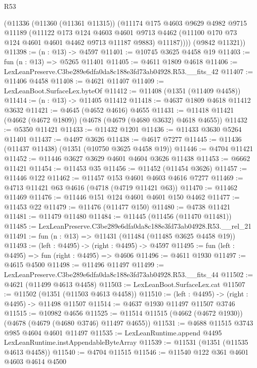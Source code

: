 \begin{lexlean}{R53}
\begin{coremodule}
        (@11336
          (@11360 (@11361 @11315))
          (@11174
            @175
            @4603
            @9629
            @4982
            @9715
            @11189
            (@11122
              @173
              @124
              @4603
              @4601
              @9713
              @4462
              (@11100 @170 @73 @124 @4601 @4601 @4462 @9713 @11187 @9883)
              @11187))))
      (@9842 @11321))
@11398 := (n : @13) -> @4597
@11401 := @10745 @3625 @4458 @19
@11403 := fun (n : @13) => @5265 @11401
@11405 := @4611 @1809 @4618
@11406 := LexLeanPreserve.C3be289e6dfa0da8c188e3fd73ab04928.R53.__fits_42
@11407 := @11406 @4458
@11408 := @4621 @11407
@11409 := LexLeanBoot.SurfaceLex.byteOf
@11412 := @11408 (@1351 (@11409 @4458))
@11414 := (n : @13) -> @11405 @11412
@11418 := @4637 @1809 @4618 @11412 @3632
@11421 := @4645 (@4652 @4616) @4655
@11431 := @11418 @11421 (@4662 (@4672 @1809)) (@4678 (@4679 (@4680 @3632) @4618 @4655))
@11432 := @5350 @11421
@11433 := @11432 @1201
@11436 := @11433 @3630 @5264 @11401
@11437 := @4497 @3626
@11438 := @4617 @7277
@11445 := @11436 (@11437 @11438) (@1351 (@10750 @3625 @4458 @19))
@11446 := @4704 @11421
@11452 := @11446 @3627 @3629 @4601 @4604 @3626 @11438
@11453 := @6662 @11421
@11454 := @11453 @35
@11456 := @11452 (@11454 @3626)
@11457 := @11446 @122
@11462 := @11457 @153 @4601 @4603 @4616 @7277
@11469 := @4713 @11421 @63 @4616 (@4718 (@4719 @11421 @63))
@11470 := @11462 @11469
@11476 := @11446 @151 @124 @4601 @4601 @150 @4462
@11477 := @11453 @22
@11479 := @11476 (@11477 @150)
@11480 := @4738 @11421
@11481 := @11479 @11480
@11484 := @11445 (@11456 (@11470 @11481))
@11485 := LexLeanPreserve.C3be289e6dfa0da8c188e3fd73ab04928.R53.__rel_21
@11491 := fun (n : @13) => @11431 (@11484 (@11485 @3625 @4458 @19))
@11493 := (left : @4495) -> (right : @4495) -> @4597
@11495 := fun (left : @4495) => fun (right : @4495) => @4606
@11496 := @4611 @1930
@11497 := @4615 @4500
@11498 := @11496 @11497
@11499 := LexLeanPreserve.C3be289e6dfa0da8c188e3fd73ab04928.R53.__fits_44
@11502 := @4621 (@11499 @4613 @4458)
@11503 := LexLeanBoot.SurfaceLex.cat
@11507 := @11502 (@1351 (@11503 @4613 @4458))
@11510 := (left : @4495) -> (right : @4495) -> @11498 @11507
@11514 := @4637 @1930 @11497 @11507 @3746
@11515 := @10982 @4656
@11525 := @11514 @11515 (@4662 (@4672 @1930)) (@4678 (@4679 (@4680 @3746) @11497 @4655))
@11531 := @4688 @11515 @3743 @985 @4604 @4601 @11497
@11535 := LexLeanRuntime.append @4495 LexLeanRuntime.instAppendableByteArray
@11539 := @11531 (@1351 (@11535 @4613 @4458))
@11540 := @4704 @11515
@11546 := @11540 @122 @361 @4601 @4603 @4614 @4500

\end{coremodule}
\end{lexlean}
